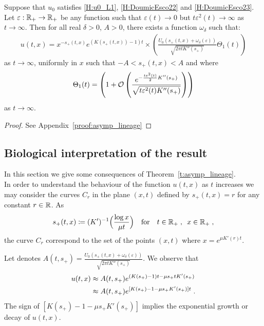 \documentclass[11pt]{amsart}
\begin{document}
\begin{theorem}\label{t:asymp_lineage}
    Suppose that  $u_0$ satisfies \eqref{H:u0_L1}, \eqref{H:DoumicEsco22} and \eqref{H:DoumicEsco23}. 
    Let $\varepsilon : \mathbb{R}_+ \to \mathbb{R}_+$ be any function such that $\varepsilon(t) \to 0$ but $t\varepsilon^2(t) \to \infty$ as $t \to \infty$. 
    Then for all real $\delta > 0$, $A > 0$, there exists a function $\omega_\delta$ such that:
\begin{equation*}
    \begin{split}
    u(t,x) = x^{-s_+(t,x)}e^{(K(s_+(t,x))-1)t} \times 
    \left( \frac{U_0(s_+(t,x)+\omega_\delta(\varepsilon))}{\sqrt{2\pi tK''(s_+)}} \Theta_1(t)\right)
    \end{split}
\end{equation*}
as $t\to \infty$, uniformly in $x$ such that $-A < s_+(t,x)< A$ and where 
\begin{align*}
    \Theta_1(t) = \left(1 + \mathcal{O} \left( \frac{e^{-\frac{t\varepsilon^2(t)}{2}K''(s_+)}}{\sqrt{t\varepsilon^2(t)K''(s_+)}} \right) \right)
\end{align*}
as $t \to \infty$. 
\end{theorem}
\begin{proof} See Appendix~\ref{proof:asymp_lineage}
\end{proof}

\subsection{Biological interpretation of the result}

In this section we give some consequences of Theorem~\ref{t:asymp_lineage}. \\

In order to understand the behaviour of the function $u(t, x)$ as $t$ increases we may consider the curves $C_r$ in the plane $(x, t)$ defined by $s_+(t, x) = r$ for any constant $r \in \mathbb{R}$. As \begin{align*}
    s_+(t,x) \coloneqq (K')^{-1} \Big( \frac{\log x}{\mu t} \Big)
    \quad \text{for} \quad t \in \mathbb{R}_+ \; , \enspace x \in \mathbb{R}_+
    \; ,
\end{align*}
the curve $C_r$ correspond to the set of the points $(x, t)$ where $x = e^{\mu K'(r) t}.$

Let denotes $A(t,s_+) = \frac{U_0(s_+(t,x)+\omega_\delta(\varepsilon))}{\sqrt{2\pi tK''(s_+)}}$. 
We observe that 
    \begin{align*}
        u(t,x)
        &\approx
        A(t,s_+) e^{(K(s_+)-1)t -  \mu s_+ t K'(s_+)} \\
        &\approx A(t,s_+) e^{[K(s_+)-1 -  \mu s_+ K'(s_+)]t}
        \; .
    \end{align*}
    The sign of $[K(s_+)-1 -  \mu s_+ K'(s_+)]$ implies the exponential growth or decay of $u(t, x)$. 
\end{document}
